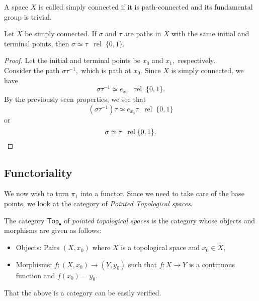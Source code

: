 \documentclass[12pt]{article}
\newcommand{\rel}{\;\;\operatorname{rel}\;}
\begin{document}
\begin{defn}
	A space $X$ is called simply connected if it is path-connected and its fundamental group is trivial.
\end{defn}
\begin{lem} \label{lem:simpconnpathshomot}
	Let $X$ be simply connected. If $\sigma$ and $\tau$ are paths in $X$ with the same initial and terminal points, then $\sigma \simeq \tau \rel \{0, 1\}.$
\end{lem}
\begin{proof} 
	Let the initial and terminal points be $x_0$ and $x_1,$ respectively.\\
	Consider the path $\sigma\tau^{-1},$ which is path at $x_0.$ Since $X$ is simply connected, we have
	\begin{equation*} 
		\sigma\tau^{-1} \simeq e_{x_0} \rel \{0, 1\}.
	\end{equation*}
	By the previously seen properties, we see that
	\begin{equation*} 
		(\sigma\tau^{-1})\tau \simeq e_{x_0}\tau \rel \{0, 1\}
	\end{equation*}
	or
	\begin{equation*} 
		\sigma \simeq \tau \rel \{0, 1\}. \qedhere
	\end{equation*}
\end{proof}
\subsection{Functoriality} \label{subsec:functor}
We now wish to turn $\pi_1$ into a functor. Since we need to take care of the base points, we look at the category of \emph{Pointed Topological spaces}.
\begin{defn}
	The category $\mathsf{Top}_\bullet$ of \emph{pointed topological spaces} is the category whose objects and morphisms are given as follows:
	\begin{itemize}
		\item Objects: Pairs $(X, x_0)$ where $X$ is a topological space and $x_0 \in X,$
		\item Morphisms: $f:(X, x_0) \to (Y, y_0)$ such that $f:X\to Y$ is a continuous function and $f(x_0) = y_0.$
	\end{itemize}
\end{defn}
That the above is a category can be easily verified.
\end{document}
